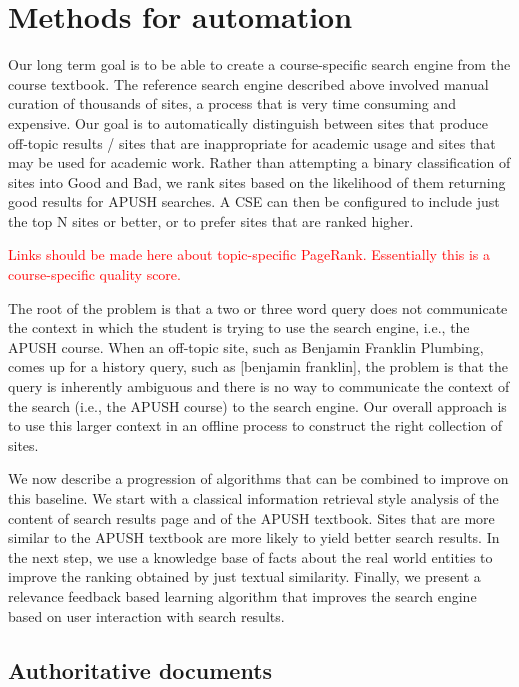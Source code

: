 \documentclass[pdfpagelabels=false,plainpages=true]{acm_proc_article-sp}
\begin{document}
\section{Methods for automation}

Our long term goal is to be able to create a course-specific search engine from
the course textbook. The reference search engine described above involved manual
curation of thousands of sites, a process that is very time consuming and
expensive. Our goal is to automatically distinguish between sites that produce
off-topic results / sites that are inappropriate for academic usage and sites
that may be used for academic work.  Rather than attempting a binary
classification of sites into Good and Bad, we rank sites based on the likelihood
of them returning good results for APUSH searches. A CSE can then be configured
to include just the top N sites or better, or to prefer sites that are ranked
higher. 

\textcolor{red}{Links should be made here about topic-specific
  PageRank. Essentially this is a course-specific quality score.}

The root of the problem is that a two or three word query does not communicate
the context in which the student is trying to use the search engine, i.e., the
APUSH course.  When an off-topic site, such as Benjamin Franklin Plumbing, comes
up for a history query, such as [benjamin franklin], the problem is that the
query is inherently ambiguous and there is no way to communicate the context of
the search (i.e., the APUSH course) to the search engine.  Our overall approach
is to use this larger context in an offline process to construct the right
collection of sites. 

We now describe a progression of algorithms that can be combined to improve on
this baseline. We start with a classical information retrieval style analysis of
the content of search results page and of the APUSH textbook. Sites that are
more similar to the APUSH textbook are more likely to yield better search
results. In the next step, we use a knowledge base of facts about the real world
entities to improve the ranking obtained by just textual similarity. Finally, we
present a relevance feedback based learning algorithm that improves the search
engine based on user interaction with search results. 

\subsection{Authoritative documents}
\end{document}
